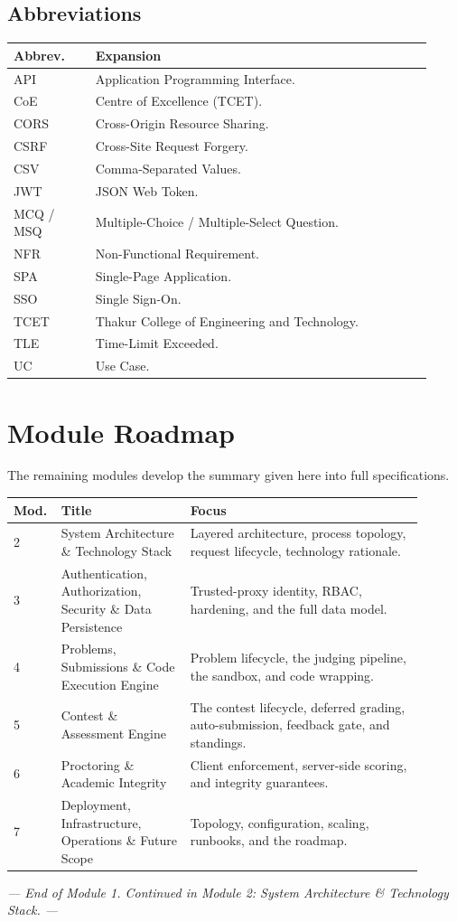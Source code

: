 \documentclass[12pt,a4paper,oneside]{report}
\begin{document}
\section{Abbreviations}
\begin{longtable}{@{}p{0.18\linewidth} p{0.74\linewidth}@{}}
\toprule
\textbf{Abbrev.} & \textbf{Expansion}\\
\midrule
\endhead
API & Application Programming Interface.\\
CoE & Centre of Excellence (TCET).\\
CORS & Cross-Origin Resource Sharing.\\
CSRF & Cross-Site Request Forgery.\\
CSV & Comma-Separated Values.\\
JWT & JSON Web Token.\\
MCQ / MSQ & Multiple-Choice / Multiple-Select Question.\\
NFR & Non-Functional Requirement.\\
SPA & Single-Page Application.\\
SSO & Single Sign-On.\\
TCET & Thakur College of Engineering and Technology.\\
TLE & Time-Limit Exceeded.\\
UC & Use Case.\\
\bottomrule
\end{longtable}

\chapter{Module Roadmap}
The remaining modules develop the summary given here into full specifications.

\begin{longtable}{@{}p{0.06\linewidth} p{0.30\linewidth} p{0.54\linewidth}@{}}
\toprule
\textbf{Mod.} & \textbf{Title} & \textbf{Focus}\\
\midrule
\endhead
2 & System Architecture \& Technology Stack & Layered architecture, process topology, request lifecycle, technology rationale.\\
3 & Authentication, Authorization, Security \& Data Persistence & Trusted-proxy identity, RBAC, hardening, and the full data model.\\
4 & Problems, Submissions \& Code Execution Engine & Problem lifecycle, the judging pipeline, the sandbox, and code wrapping.\\
5 & Contest \& Assessment Engine & The contest lifecycle, deferred grading, auto-submission, feedback gate, and standings.\\
6 & Proctoring \& Academic Integrity & Client enforcement, server-side scoring, and integrity guarantees.\\
7 & Deployment, Infrastructure, Operations \& Future Scope & Topology, configuration, scaling, runbooks, and the roadmap.\\
\bottomrule
\end{longtable}

\vspace{0.6cm}
\begin{center}
\textit{--- End of Module 1. Continued in Module 2: System Architecture \& Technology Stack. ---}
\end{center}
\end{document}
